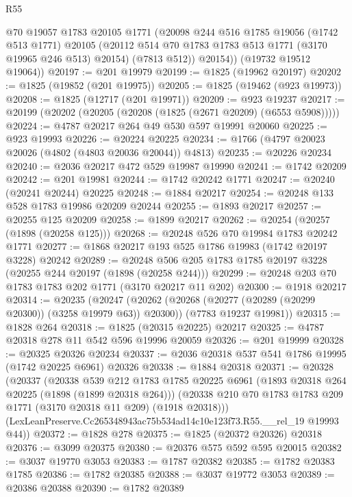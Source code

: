 \begin{lexlean}{R55}
\begin{coremodule}
          @70
          @19057
          @1783
          @20105
          @1771
          (@20098
            @244
            @516
            @1785
            @19056
            (@1742 @513 @1771)
            @20105
            (@20112 @514 @70 @1783 @1783 @513 @1771 (@3170 @19965 @246 @513) @20154)
            (@7813 @512))
          @20154))
      (@19732 @19512 @19064))
@20197 := @201 @19979
@20199 := @1825 (@19962 @20197)
@20202 := @1825 (@19852 (@201 @19975))
@20205 := @1825 (@19462 (@923 @19973))
@20208 := @1825 (@12717 (@201 @19971))
@20209 := @923 @19237
@20217 := @20199 (@20202 (@20205 (@20208 (@1825 (@2671 @20209) (@6553 @5908)))))
@20224 := @4787 @20217 @264 @49 @530 @597 @19991 @20060
@20225 := @923 @19993
@20226 := @20224 @20225
@20234 := @1766 (@4797 @20023 @20026 (@4802 (@4803 @20036 @20044)) @4813)
@20235 := @20226 @20234
@20240 := @2036 @20217 @472 @529 @19987 @19990
@20241 := @1742 @20209
@20242 := @201 @19981
@20244 := @1742 @20242 @1771
@20247 := @20240 (@20241 @20244) @20225
@20248 := @1884 @20217
@20254 := @20248 @133 @528 @1783 @19986 @20209 @20244
@20255 := @1893 @20217
@20257 := @20255 @125 @20209
@20258 := @1899 @20217
@20262 := @20254 (@20257 (@1898 (@20258 @125)))
@20268 := @20248 @526 @70 @19984 @1783 @20242 @1771
@20277 := @1868 @20217 @193 @525 @1786 @19983 (@1742 @20197 @3228) @20242
@20289 := @20248 @506 @205 @1783 @1785 @20197 @3228 (@20255 @244 @20197 (@1898 (@20258 @244)))
@20299 := @20248 @203 @70 @1783 @1783 @202 @1771 (@3170 @20217 @11 @202)
@20300 := @1918 @20217
@20314 := @20235
    (@20247
      (@20262 (@20268 (@20277 (@20289 (@20299 @20300)) (@3258 @19979 @63)) @20300))
      (@7783 @19237 @19981))
@20315 := @1828 @264
@20318 := @1825 (@20315 @20225) @20217
@20325 := @4787 @20318 @278 @11 @542 @596 @19996 @20059
@20326 := @201 @19999
@20328 := @20325 @20326 @20234
@20337 := @2036 @20318 @537 @541 @1786 @19995 (@1742 @20225 @6961) @20326
@20338 := @1884 @20318
@20371 := @20328
    (@20337
      (@20338
        @539
        @212
        @1783
        @1785
        @20225
        @6961
        (@1893 @20318 @264 @20225 (@1898 (@1899 @20318 @264)))
        (@20338 @210 @70 @1783 @1783 @209 @1771 (@3170 @20318 @11 @209) (@1918 @20318)))
      (LexLeanPreserve.Cc265348943ac75b534ad14c10e123f73.R55.__rel_19 @19993 @44))
@20372 := @1828 @278
@20375 := @1825 (@20372 @20326) @20318
@20376 := @3099 @20375
@20380 := @20376 @575 @592 @595 @20015
@20382 := @3037 @19770 @3053
@20383 := @1787 @20382
@20385 := @1782 @20383 @1785
@20386 := @1782 @20385
@20388 := @3037 @19772 @3053
@20389 := @20386 @20388
@20390 := @1782 @20389

\end{coremodule}
\end{lexlean}
